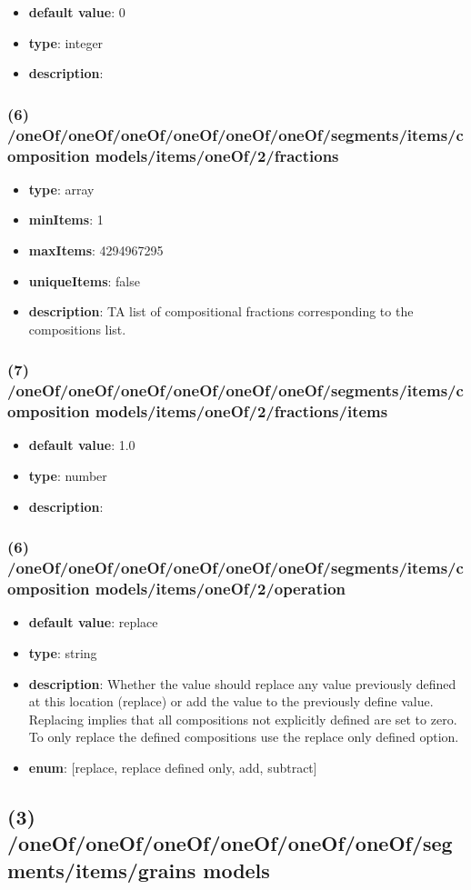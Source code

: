 \begin{itemize}[leftmargin=7em]\item {\bf default value}: 0
\item {\bf type}: integer
\item {\bf description}: 
\end{itemize}\subsubsection{(6) /oneOf/oneOf/oneOf/oneOf/oneOf/oneOf/segments/items/composition models/items/oneOf/2/fractions}
\begin{itemize}[leftmargin=6em]\item {\bf type}: array
\item {\bf minItems}: 1
\item {\bf maxItems}: 4294967295
\item {\bf uniqueItems}: false
\item {\bf description}: TA list of compositional fractions corresponding to the compositions list.
\end{itemize}\subsubsection{(7) /oneOf/oneOf/oneOf/oneOf/oneOf/oneOf/segments/items/composition models/items/oneOf/2/fractions/items}
\begin{itemize}[leftmargin=7em]\item {\bf default value}: 1.0
\item {\bf type}: number
\item {\bf description}: 
\end{itemize}\subsubsection{(6) /oneOf/oneOf/oneOf/oneOf/oneOf/oneOf/segments/items/composition models/items/oneOf/2/operation}
\begin{itemize}[leftmargin=6em]\item {\bf default value}: replace
\item {\bf type}: string
\item {\bf description}: Whether the value should replace any value previously defined at this location (replace) or add the value to the previously define value. Replacing implies that all compositions not explicitly defined are set to zero. To only replace the defined compositions use the replace only defined option.
\item {\bf enum}: [replace, replace defined only, add, subtract]\end{itemize}\subsection{(3) /oneOf/oneOf/oneOf/oneOf/oneOf/oneOf/segments/items/grains models}
